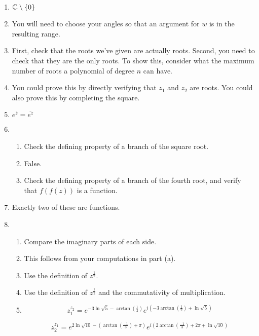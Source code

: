 \begin{enumerate}
\begin{enumerate}
\end{enumerate}

\item $\mathbb{C} \setminus\{0\}$

\item You will need to choose your angles so that an argument for $w$ is in the resulting range.

\item First, check that the roots we've given are actually roots. Second, you need to check that they are the only roots. To show this, consider what the maximum number of roots a polynomial of degree $n$ can have.

\item You could prove this by directly verifying that $z_1$ and $z_2$ are roots. You could also prove this by completing the square.

\item $e^{\overline{z}} = \overline{e^z}$

\item \begin{enumerate}
\item Check the defining property of a branch of the square root.
\item False.
\item Check the defining property of a branch of the fourth root, and verify that $f(f(z))$ is a function.

\end{enumerate}

\item Exactly two of these are functions.

\item \begin{enumerate}
\item Compare the imaginary parts of each side.
\item This follows from your computations in part (a).
\item Use the definition of $z^{\frac{1}{2}}$.
\item Use the definition of $z^{\frac{1}{2}}$ and the commutativity of multiplication.
\item $$z_1^{z_2} = e^{-3\ln\sqrt{5} - \arctan\left(\frac{1}{2}\right)}e^{i(-3\arctan\left(\frac{1}{2}\right) + \ln\sqrt{5})}$$ 

$$z_2^{z_1} = e^{2\ln\sqrt{10} - (\arctan\left(\frac{-1}{3}\right) + \pi)}e^{i(2\arctan\left(\frac{-1}{3}\right) + 2\pi + \ln\sqrt{10})}$$

\end{enumerate}


\end{enumerate}
